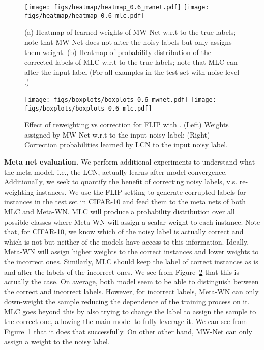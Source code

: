 \begin{figure}[t] \centering
  \texttt{[image: figs/heatmap/heatmap\_0.6\_mwnet.pdf]}
  \texttt{[image: figs/heatmap/heatmap\_0.6\_mlc.pdf]}
  \caption{(a) Heatmap of learned weights of MW-Net w.r.t to the true
    labels; note that MW-Net does not alter the noisy labels but only assigns them weight. (b) Heatmap of probability distribution of the corrected
    labels of MLC w.r.t to the true labels; note that MLC can alter the input label (For all examples in the
    test set with noise level .)}
  \label{fig:metanet}
\end{figure}

\begin{figure}[t]
\centering
\texttt{[image: figs/boxplots/boxplots\_0.6\_mwnet.pdf]}
\texttt{[image: figs/boxplots/boxplots\_0.6\_mlc.pdf]}
  \caption{Effect of reweighting vs correction for \textsf{FLIP} with . (Left) Weights assigned by MW-Net w.r.t to the input noisy label; (Right) Correction probabilities learned by LCN to the input noisy label.}
  \label{fig:boxplot}
\end{figure}



\textbf{Meta net evaluation.} We perform additional experiments to understand what the meta model, i.e., the LCN, actually learns
after model convergence. Additionally, we seek to quantify the benefit of correcting noisy labels, v.s. re-weighting instances.  We use the \textsf{FLIP} setting to
generate corrupted labels for instances in the test set in CIFAR-10
and feed them to the meta nets of both MLC and Meta-WN. MLC will produce a probability distribution over all possible classes where Meta-WN will assign a scalar weight to each instance.
Note that, for CIFAR-10, we know which of the noisy label is actually correct and which is not but neither of the models have access to this information. Ideally, Meta-WN will assign higher weights to the correct instances and lower weights to the incorrect ones. Similarly, MLC should keep the label of correct instances as is and alter the labels of the incorrect ones. We see from Figure~\ref{fig:boxplot} that this is actually the case. On average, both model seem to be able to distinguish between the correct and incorrect labels. However, for incorrect labels, Meta-WN can only down-weight the sample reducing the dependence of the training process on it. MLC goes beyond this by also trying to change the label to assign the sample to the correct one, allowing the main model to fully leverage it. We can see from Figure~\ref{fig:metanet} that it does that successfully. On other other hand, MW-Net can only assign a weight to the noisy label. 


